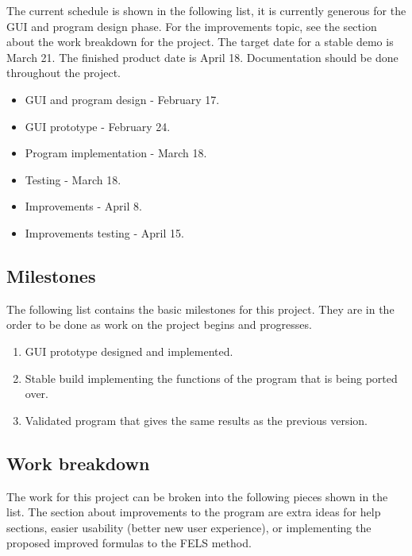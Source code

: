 \documentclass[12pt,letterpaper]{article}
\begin{document}
The current schedule is shown in the following list, it is currently generous for the GUI and program design phase. For the improvements topic, see the section about the work breakdown for the project. The target date for a stable demo is March 21. The finished product date is April 18. Documentation should be done throughout the project.

\begin{itemize}

\item GUI and program design - February 17.
\item GUI prototype - February 24.
\item Program implementation - March 18.
\item Testing - March 18.
\item Improvements - April 8.
\item Improvements testing - April 15.

\end{itemize}

\subsection{Milestones}

The following list contains the basic milestones for this project. They are in the order to be done as work on the project begins and progresses.

\begin{enumerate}

\item GUI prototype designed and implemented.
\item Stable build implementing the functions of the program that is being ported over.
\item Validated program that gives the same results as the previous version.

\end{enumerate}

\subsection{Work breakdown}

The work for this project can be broken into the following pieces shown in the list. The section about improvements to the program are extra ideas for help sections, easier usability (better new user experience), or implementing the proposed improved formulas to the FELS method.
\end{document}
